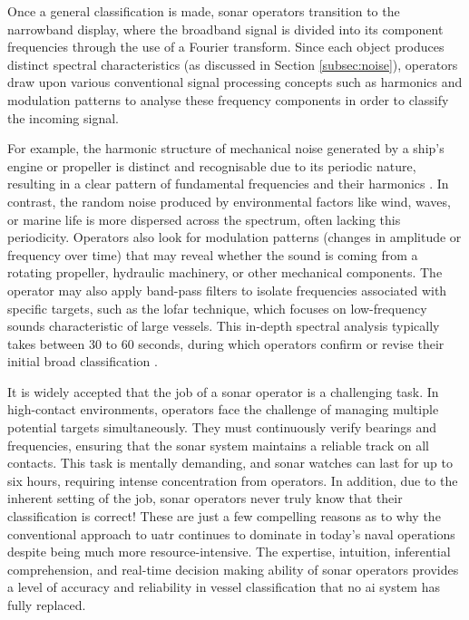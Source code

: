 Once a general classification is made, sonar operators transition to the narrowband display, where the broadband signal is divided into its component frequencies through the use of a Fourier transform. Since each object produces distinct spectral characteristics (as discussed in Section \ref{subsec:noise}), operators draw upon various conventional signal processing concepts such as harmonics and modulation patterns to analyse these frequency components in order to classify the incoming signal.

For example, the harmonic structure of mechanical noise generated by a ship's engine or propeller is distinct and recognisable due to its periodic nature, resulting in a clear pattern of fundamental frequencies and their harmonics \cite{chin-hsing_classification_1998}. In contrast, the random noise produced by environmental factors like wind, waves, or marine life is more dispersed across the spectrum, often lacking this periodicity. Operators also look for modulation patterns (changes in amplitude or frequency over time) that may reveal whether the sound is coming from a rotating propeller, hydraulic machinery, or other mechanical components. The operator may also apply band-pass filters to isolate frequencies associated with specific targets, such as the \acrfull{lofar} technique, which focuses on low-frequency sounds characteristic of large vessels. This in-depth spectral analysis typically takes between 30 to 60 seconds, during which operators confirm or revise their initial broad classification \cite{amick_how_2020}.

It is widely accepted that the job of a sonar operator is a challenging task. In high-contact environments, operators face the challenge of managing multiple potential targets simultaneously. They must continuously verify bearings and frequencies, ensuring that the sonar system maintains a reliable track on all contacts. This task is mentally demanding, and sonar watches can last for up to six hours, requiring intense concentration from operators. In addition, due to the inherent setting of the job, sonar operators never truly know that their classification is correct! These are just a few compelling reasons as to why the conventional approach to \acrshort{uatr} continues to dominate in today’s naval operations despite being much more resource-intensive. The expertise, intuition, inferential comprehension, and real-time decision making ability of sonar operators provides a level of accuracy and reliability in vessel classification that no \acrshort{ai} system has fully replaced.

